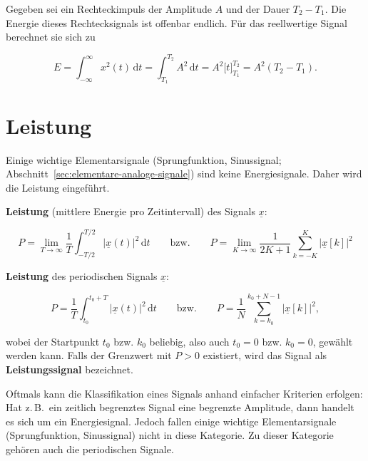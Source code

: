 \begin{beispiel}
Gegeben sei ein Rechteckimpuls der Amplitude $A$ und der Dauer $T_2 - T_1$. Die Energie dieses Rechtecksignals ist offenbar endlich. Für das reellwertige Signal berechnet sie sich zu

$$
E = \int_{-\infty}^{\infty} x^2(t)\,\mathrm{d}t = \int_{T_1}^{T_2} A^2\,\mathrm{d}t = A^2\bigl[t\bigr]_{T_1}^{T_2} = A^2(T_2 - T_1).
$$
\end{beispiel}


\section{Leistung}
\label{sec:leistung}


Einige wichtige Elementarsignale (Sprungfunktion, Sinussignal; Abschnitt~\ref{sec:elementare-analoge-signale}) sind
keine Energiesignale. Daher wird die Leistung eingeführt.


\begin{definition}
\textbf{Leistung} (mittlere Energie pro Zeitintervall) des Signals $\underline{x}$:

$$
P = \lim_{T \to \infty} \frac{1}{T} \int_{-T/2}^{T/2} |\underline{x}(t)|^2\,\mathrm{d}t
\qquad \text{bzw.} \qquad
P = \lim_{K \to \infty} \frac{1}{2K+1} \sum_{k=-K}^{K} |\underline{x}[k]|^2
$$

\textbf{Leistung} des periodischen Signals $\underline{x}$:

$$
P = \frac{1}{T} \int_{t_0}^{t_0+T} |\underline{x}(t)|^2\,\mathrm{d}t
\qquad \text{bzw.} \qquad
P = \frac{1}{N} \sum_{k=k_0}^{k_0+N-1} |\underline{x}[k]|^2,
$$

wobei der Startpunkt $t_0$ bzw. $k_0$ beliebig, also auch $t_0 = 0$ bzw. $k_0 = 0$,
gewählt werden kann. Falls der Grenzwert mit $P > 0$ existiert, wird
das Signal als \textbf{Leistungssignal} bezeichnet.
\end{definition}

Oftmals kann die Klassifikation eines Signals anhand einfacher Kriterien erfolgen: Hat z.\,B.\ ein zeitlich begrenztes Signal eine begrenzte Amplitude, dann handelt es sich um ein Energiesignal. Jedoch fallen einige wichtige Elementarsignale (Sprungfunktion, Sinussignal) nicht in diese Kategorie. Zu dieser Kategorie gehören auch die periodischen Signale.

